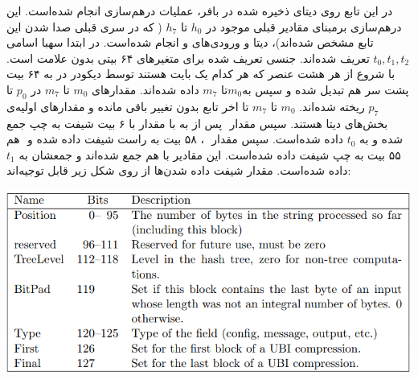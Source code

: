 در این تابع روی دیتای ذخیره شده در بافر، عملیات درهم‌سازی انجام شده‌است. این درهم‌سازی برمبنای مقادیر قبلی موجود در $  h_0 $ تا  $ h_7 $ ( که در سری قبلی صدا شدن این تابع مشخص شده‌اند)، دیتا و ورودی‌های  و   انجام شده‌است.
در ابتدا سهبا اسامی $ t_0 , t_1 , t_2 $ تعریف شده‌اند. جنسی تعریف شده برای متغیرهای ۶۴ بیتی بدون علامت است. با شروع از  هر هشت عنصر که هر کدام یک بایت هستند توسط دیکودر در  به ۶۴ بیت پشت سر هم تبدیل شده و سپس به$ m_0 $تا $ m_7 $ داده شده‌اند. مقدارهای $ m_0 $ تا $ m_7 $ در $ p_0 $ تا $ p_7 $ ریخته شده‌اند. $ m_0 $ تا $ m_7 $ تا اخر تابع بدون تغییر باقی مانده و مقدارهای اولیه‌ی بخش‌های دیتا هستند.
سپس مقدار ‌ پس از  به با مقدار  با ۶ بیت شیفت به چپ جمع شده و به $ t_0 $ داده شده‌است. سپس مقدار ‌ ، ۵۸ بیت به راست شیفت داده شده و ‌ هم ۵۵ بیت به چپ شیفت داده شده‌است. این مقادیر با هم جمع شده‌‌اند و جمعشان به ‌$ t_1 $ داده شده‌است. مقدار شیفت داده شدن‌ها از روی شکل زیر قابل توجیه‌اند:
\begin{center}
	\includegraphics[width=14cm]{images/GoldenModelDocumentation/tweak.png}
\end{center}

